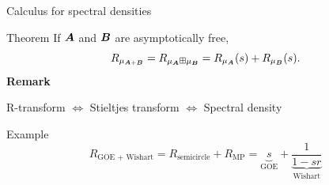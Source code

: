 \documentclass[10pt]{beamer}
\begin{document}
\begin{frame}{Calculus for spectral densities}
\begin{alertblock}{Theorem}
If $\AA$ and $\BB$ are asymptotically free, 
\[R_{\mu_{\AA + \BB}} = R_{\mu_{\AA} \boxplus \mu_{\BB}} = R_{\mu_{\AA}}(s) + R_{\mu_\BB}(s).\]
\textbf{Remark} \vspace{-0.5cm}
\begin{center}
    R-transform \quad $\Leftrightarrow$ \quad Stieltjes transform \quad $\Leftrightarrow$ \quad Spectral density
\end{center}
\end{alertblock}


\begin{exampleblock}{Example}
  \[R_{\text{GOE + Wishart}} = R_{\text{semicircle}} + R_{\text{MP}}= \underbrace{s}_{\text{GOE}} + \underbrace{\frac{1}{1-sr}}_{\text{Wishart}}\]
\end{exampleblock}

\end{frame}

\end{document}
